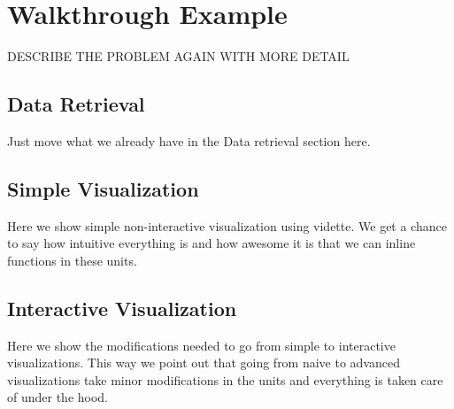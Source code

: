 \section{Walkthrough Example}

DESCRIBE THE PROBLEM AGAIN WITH MORE DETAIL

\subsection{Data Retrieval}
Just move what we already have in the Data retrieval section here.

\subsection{Simple Visualization}
Here we show simple non-interactive visualization using vidette. We get a chance to say how intuitive everything is and how awesome it is that we can inline functions in these units.

\subsection{Interactive Visualization}
Here we show the modifications needed to go from simple to interactive visualizations. This way we point out that going from naive to advanced visualizations take minor modifications in the units and everything is taken care of under the hood.